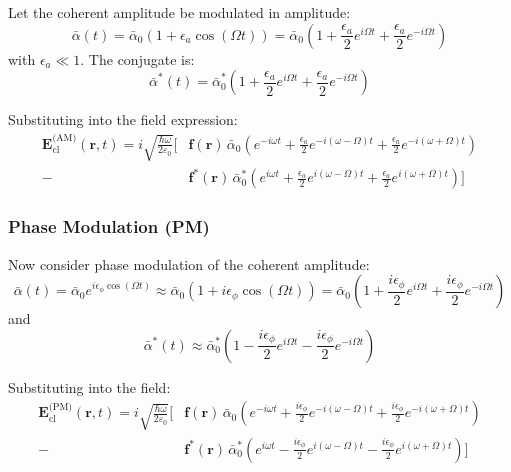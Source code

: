 Let the coherent amplitude be modulated in amplitude:
\begin{equation}
    \bar{\alpha}(t) = \bar{\alpha}_0 \left(1 + \epsilon_a \cos(\Omega t)\right)
    = \bar{\alpha}_0 \left(1 + \frac{\epsilon_a}{2} e^{i\Omega t} + \frac{\epsilon_a}{2} e^{-i\Omega t} \right)
\end{equation}
with $\epsilon_a \ll 1$. The conjugate is:
\begin{equation}
    \bar{\alpha}^*(t) = \bar{\alpha}_0^* \left(1 + \frac{\epsilon_a}{2} e^{i\Omega t} + \frac{\epsilon_a}{2} e^{-i\Omega t} \right)
\end{equation}

Substituting into the field expression:
\begin{align}
    \mathbf{E}_{\text{cl}}^{\text{(AM)}}(\mathbf{r}, t) =
    i \sqrt{\frac{\hbar \omega}{2 \varepsilon_0}} \Big[
    &\mathbf{f}(\mathbf{r})\, \bar{\alpha}_0 \left( e^{-i\omega t} + \frac{\epsilon_a}{2} e^{-i(\omega - \Omega)t} + \frac{\epsilon_a}{2} e^{-i(\omega + \Omega)t} \right) \nonumber \\
    - &\mathbf{f}^*(\mathbf{r})\, \bar{\alpha}_0^* \left( e^{i\omega t} + \frac{\epsilon_a}{2} e^{i(\omega - \Omega)t} + \frac{\epsilon_a}{2} e^{i(\omega + \Omega)t} \right)
    \Big]
\end{align}

\subsubsection*{Phase Modulation (PM)}

Now consider phase modulation of the coherent amplitude:
\begin{equation}
    \bar{\alpha}(t) = \bar{\alpha}_0 e^{i \epsilon_\phi \cos(\Omega t)}
    \approx \bar{\alpha}_0 \left(1 + i \epsilon_\phi \cos(\Omega t)\right)
    = \bar{\alpha}_0 \left(1 + \frac{i \epsilon_\phi}{2} e^{i\Omega t} + \frac{i \epsilon_\phi}{2} e^{-i\Omega t} \right)
\end{equation}
and
\begin{equation}
    \bar{\alpha}^*(t) \approx \bar{\alpha}_0^* \left(1 - \frac{i \epsilon_\phi}{2} e^{i\Omega t} - \frac{i \epsilon_\phi}{2} e^{-i\Omega t} \right)
\end{equation}

Substituting into the field:
\begin{align}
    \mathbf{E}_{\text{cl}}^{\text{(PM)}}(\mathbf{r}, t) =
    i \sqrt{\frac{\hbar \omega}{2 \varepsilon_0}} \Big[
    &\mathbf{f}(\mathbf{r})\, \bar{\alpha}_0 \left( e^{-i\omega t} + \frac{i \epsilon_\phi}{2} e^{-i(\omega - \Omega)t} + \frac{i \epsilon_\phi}{2} e^{-i(\omega + \Omega)t} \right) \nonumber \\
    - &\mathbf{f}^*(\mathbf{r})\, \bar{\alpha}_0^* \left( e^{i\omega t} - \frac{i \epsilon_\phi}{2} e^{i(\omega - \Omega)t} - \frac{i \epsilon_\phi}{2} e^{i(\omega + \Omega)t} \right)
    \Big]
\end{align}

